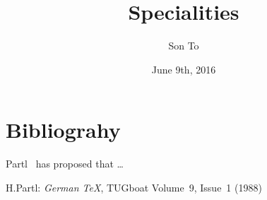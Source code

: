 \documentclass[a4paper,11pt]{article}
\author{Son To}
\date{June 9th, 2016}
\title{Specialities}
\begin{document}
  \maketitle
  \tableofcontents
  \section{Bibliograhy}
Partl~\cite{pa} has
proposed that \ldots
  \begin{thebibliography}{99}
    H.Partl:
    \emph{German \TeX},
    TUGboat Volume~9, Issue~1 (1988)
  \end{thebibliography}
\end{document}
